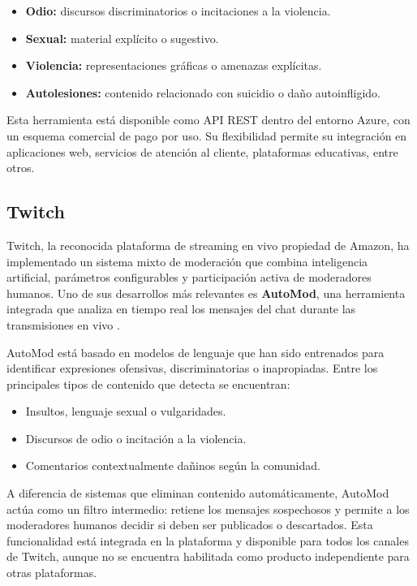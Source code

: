 \begin{itemize}
    \item \textbf{Odio:} discursos discriminatorios o incitaciones a la violencia.
    \item \textbf{Sexual:} material explícito o sugestivo.
    \item \textbf{Violencia:} representaciones gráficas o amenazas explícitas.
    \item \textbf{Autolesiones:} contenido relacionado con suicidio o daño autoinfligido.
\end{itemize}

Esta herramienta está disponible como API REST dentro del entorno Azure, con un esquema comercial de pago por uso. Su flexibilidad permite su integración en aplicaciones web, servicios de atención al cliente, plataformas educativas, entre otros.

\subsection{Twitch}

Twitch, la reconocida plataforma de streaming en vivo propiedad de Amazon, ha implementado un sistema mixto de moderación que combina inteligencia artificial, parámetros configurables y participación activa de moderadores humanos. Uno de sus desarrollos más relevantes es \textbf{AutoMod}, una herramienta integrada que analiza en tiempo real los mensajes del chat durante las transmisiones en vivo \cite{twitch2025chattools}.






\vspace{0.5cm}

AutoMod está basado en modelos de lenguaje que han sido entrenados para identificar expresiones ofensivas, discriminatorias o inapropiadas. Entre los principales tipos de contenido que detecta se encuentran:

\begin{itemize}
    \item Insultos, lenguaje sexual o vulgaridades.
    \item Discursos de odio o incitación a la violencia.
    \item Comentarios contextualmente dañinos según la comunidad.
\end{itemize}

A diferencia de sistemas que eliminan contenido automáticamente, AutoMod actúa como un filtro intermedio: retiene los mensajes sospechosos y permite a los moderadores humanos decidir si deben ser publicados o descartados. Esta funcionalidad está integrada en la plataforma y disponible para todos los canales de Twitch, aunque no se encuentra habilitada como producto independiente para otras plataformas.

